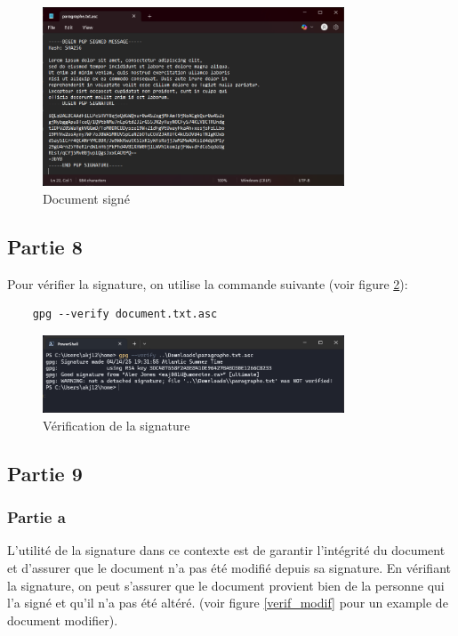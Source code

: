 \documentclass[12pt,a4paper]{article}
\begin{document}
\begin{figure}[ht]
    \centering
    \includegraphics[width=0.8\textwidth]{../img/sign.png}
    \caption{Document signé}
    \label{sign}
\end{figure}

\subsection{Partie 8}
Pour vérifier la signature, on utilise la commande suivante (voir figure \ref{verif}):
\begin{verbatim}
    gpg --verify document.txt.asc
\end{verbatim}

\begin{figure}[ht]
    \centering
    \includegraphics[width=0.8\textwidth]{../img/verif.png}
    \caption{Vérification de la signature}
    \label{verif}
\end{figure}

\subsection{Partie 9}
\subsubsection{Partie a}
L'utilité de la signature dans ce contexte est de garantir l'intégrité du document et d'assurer que le document n'a pas été modifié depuis sa signature.
En vérifiant la signature, on peut s'assurer que le document provient bien de la personne qui l'a signé et qu'il n'a pas été altéré.
(voir figure \ref{verif_modif} pour un example de document modifier).
\end{document}
